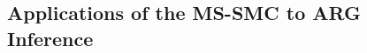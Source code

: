 \documentclass[11pt]{article}
\begin{document}

\subsection{Applications of the MS-SMC to ARG Inference}
\end{document}
